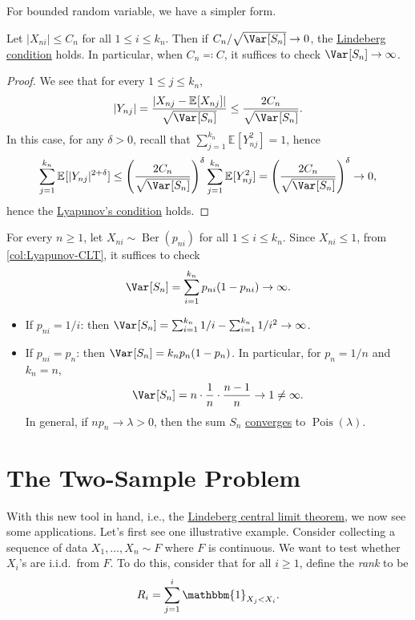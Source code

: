 For bounded random variable, we have a simpler form.

\begin{corollary}\label{col:Lyapunov-CLT}
	Let \(\vert X_{ni} \vert \leq C_n\) for all \(1 \leq i \leq k_n\). Then if \(C_n / \sqrt{\Var_{}[S_n] } \to 0\), the \hyperref[def:Lindeberg-condition]{Lindeberg condition} holds. In particular, when \(C_n \eqqcolon C\), it suffices to check \(\Var_{}[S_n] \to \infty \).
\end{corollary}
\begin{proof}
	We see that for every \(1 \leq j \leq k_n\),
	\[
		\vert Y_{nj} \vert
		= \frac{\vert X_{nj} - \mathbb{E}_{}[X_{nj}] \vert }{\sqrt{\Var_{}[S_n] } }
		\leq \frac{2 C_n}{\sqrt{\Var_{}[S_n] } }.
	\]
	In this case, for any \(\delta > 0\), recall that \(\sum_{j=1}^{k_n} \mathbb{E}_{}[Y_{nj}^2] = 1\), hence
	\[
		\sum_{j=1}^{k_n} \mathbb{E}_{}[\vert Y_{nj} \vert ^{2 + \delta }]
		\leq \left( \frac{2C_n}{\sqrt{\Var_{}[S_n] } } \right) ^\delta \sum_{j=1}^{k_n} \mathbb{E}_{}[Y_{nj}^2]
		= \left( \frac{2C_n}{\sqrt{\Var_{}[S_n] } } \right) ^\delta
		\to 0,
	\]
	hence the \hyperref[thm:Lyapunov-CLT]{Lyapunov's condition} holds.
\end{proof}

\begin{eg}\label{eg:Lyapunov-CLT}
	For every \(n \geq 1\), let \(X_{ni} \sim \operatorname{Ber}(p_{ni}) \) for all \(1 \leq i \leq k_n\). Since \(X_{ni} \leq 1\), from \autoref{col:Lyapunov-CLT}, it suffices to check
	\[
		\Var_{}[S_n]
		= \sum_{i=1}^{k_n} p_{ni} (1 - p_{ni}) \to \infty .
	\]
	\begin{itemize}
		\item If \(p_{ni} = 1 / i\): then \(\Var_{}[S_n] = \sum_{i=1}^{k_n} 1 / i - \sum_{i=1}^{k_n} 1 / i^2 \to \infty \).
		\item If \(p_{ni} = p_n\): then \(\Var_{}[S_n] = k_n p_n (1 - p_n)\). In particular, for \(p_n = 1 / n\) and \(k_n = n\),
		      \[
			      \Var_{}[S_n]
			      = n \cdot \frac{1}{n} \cdot \frac{n-1}{n}
			      \to 1
			      \neq \infty .
		      \]
		      In general, if \(n p_n \to \lambda > 0\), then the sum \(S_n\) \hyperref[def:converge-in-distribution]{converges} to \(\operatorname{Pois}(\lambda ) \).
	\end{itemize}
\end{eg}

\section{The Two-Sample Problem}
With this new tool in hand, i.e., the \hyperref[thm:Lindeberg-CLT]{Lindeberg central limit theorem}, we now see some applications. Let's first see one illustrative example. Consider collecting a sequence of data \(X_1, \dots , X_n \sim F\) where \(F\) is continuous. We want to test whether \(X_i\)'s are i.i.d.\ from \(F\). To do this, consider that for all \(i \geq 1\), define the \emph{rank} to be
\[
	R_i = \sum_{j=1}^{i} \mathbbm{1}_{X_j < X_i}.
\]


